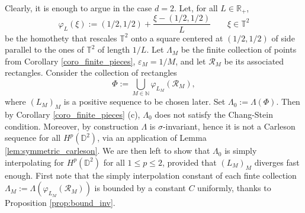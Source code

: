 \documentclass{amsart}
\numberwithin{equation}{section}
\newtheorem{lem}[thm]{Lemma}
\newcommand{\D}{\mathbb{D}}
\newcommand{\R}{\mathbb{R}}
\newcommand{\T}{\mathbb{T}}
\newcommand{\quilt}{\mathcal{R}}
\begin{document}

Clearly, it is enough to argue in the case $d=2$. Let, for all $L\in\R_+$, 
\[
\varphi_L(\xi):=(1/2, 1/2)+\frac{\xi-(1/2, 1/2)}{L}\qquad \xi\in\T^2
\]
be the homothety that rescales $\T^2$ onto a square centered at $(1/2, 1/2)$ of side parallel to the ones of $\T^2$ of length $1/L$. Let $\Lambda_M$ be the finite collection of points from Corollary \ref{coro_finite_pieces}, $\varepsilon_M=1/M$, and let $\quilt_M$ be its associated rectangles.  Consider the collection of rectangles
\[
\Phi:=\bigcup_{M\in\mathbb{N}}\varphi_{L_M}(\quilt_M),
\]
where  $(L_M)_M$ is a positive sequence to be chosen later. Set $\Lambda_0:=\Lambda(\Phi)$. Then by Corollary \ref{coro_finite_pieces} (c), $\Lambda_0$ does not satisfy the Chang-Stein condition. Moreover, by construction $\Lambda$ is $\sigma$-invariant, hence it is not a Carleson sequence for all $H^p(\mathbb{D}^2)$, via an application of Lemma \ref{lem:symmetric_carleson}. We are then left to show that $\Lambda_0$ is simply interpolating for $H^p(\mathbb{D}^2)$ for all $1\leq p\le2$, provided that $(L_M)_M$ diverges fast enough. First note that the simply interpolation constant of each finte collection $\Lambda_M:=\Lambda(\varphi_{L_M}(\quilt_M))$ is bounded by a constant $C$ uniformly, thanks to Proposition \ref{prop:bound_inv}. 
\end{document}
